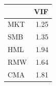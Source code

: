 \begin{tabular}{lr}
\toprule
 & VIF \\
\midrule
MKT & 1.25 \\
SMB & 1.35 \\
HML & 1.94 \\
RMW & 1.64 \\
CMA & 1.81 \\
\bottomrule
\end{tabular}
